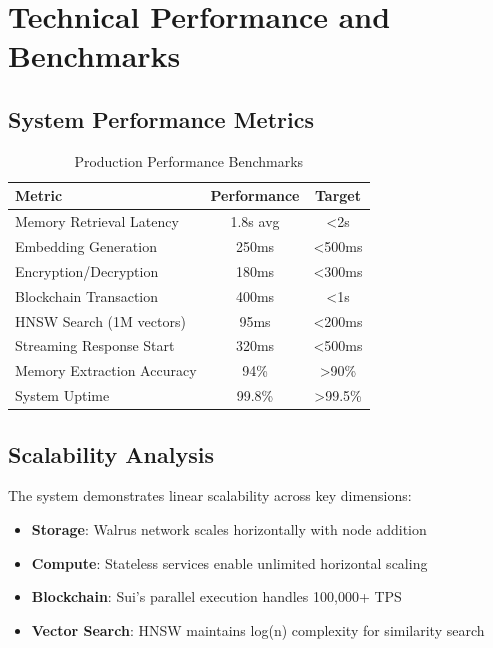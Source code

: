 \documentclass[12pt, a4paper]{article}
\begin{document}
\section{Technical Performance and Benchmarks}

\subsection{System Performance Metrics}

\begin{table}[H]
\centering
\caption{Production Performance Benchmarks}
\label{tab:performance}
\begin{tabular}{|l|c|c|}
\hline
\textbf{Metric} & \textbf{Performance} & \textbf{Target} \\
\hline
Memory Retrieval Latency & 1.8s avg & <2s \\
Embedding Generation & 250ms & <500ms \\
Encryption/Decryption & 180ms & <300ms \\
Blockchain Transaction & 400ms & <1s \\
HNSW Search (1M vectors) & 95ms & <200ms \\
Streaming Response Start & 320ms & <500ms \\
Memory Extraction Accuracy & 94\% & >90\% \\
System Uptime & 99.8\% & >99.5\% \\
\hline
\end{tabular}
\end{table}

\subsection{Scalability Analysis}

The system demonstrates linear scalability across key dimensions:

\begin{itemize}
    \item \textbf{Storage}: Walrus network scales horizontally with node addition
    \item \textbf{Compute}: Stateless services enable unlimited horizontal scaling
    \item \textbf{Blockchain}: Sui's parallel execution handles 100,000+ TPS
    \item \textbf{Vector Search}: HNSW maintains log(n) complexity for similarity search
\end{itemize}
\end{document}
